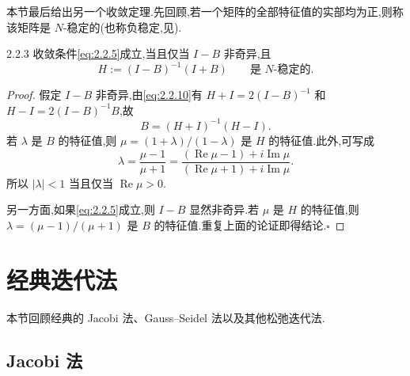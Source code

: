 本节最后给出另一个收敛定理.先回顾,若一个矩阵的全部特征值的实部均为正,则称该矩阵是 \(N\)-稳定的(也称负稳定,见).

\begin{theorem}[]{2.2.3}
收敛条件\eqref{eq:2.2.5}成立,当且仅当 \(I-B\) 非奇异,且
\begin{equation}\label{eq:2.2.10}
  H:=(I-B)^{-1}(I+B)\qquad \text{是 \(N\)-稳定的.}
\end{equation}
\end{theorem}

\begin{proof}
假定 \(I-B\) 非奇异,由\eqref{eq:2.2.10}有 \(H+I=2(I-B)^{-1}\) 和 \(H-I=2(I-B)^{-1}B\),故
\[
  B=(H+I)^{-1}(H-I).
\]
若 \(\lambda\) 是 \(B\) 的特征值,则 \(\mu=(1+\lambda)/(1-\lambda)\) 是 \(H\) 的特征值.此外,可写成
\[
  \lambda=\frac{\mu-1}{\mu+1}
    =\frac{(\operatorname{Re}\mu-1)+i\operatorname{Im}\mu}
           {(\operatorname{Re}\mu+1)+i\operatorname{Im}\mu}.
\]
所以 \(|\lambda|<1\) 当且仅当 \(\operatorname{Re}\mu>0\).

另一方面,如果\eqref{eq:2.2.5}成立,则 \(I-B\) 显然非奇异.若 \(\mu\) 是 \(H\) 的特征值,则 \(\lambda=(\mu-1)/(\mu+1)\) 是 \(B\) 的特征值.重复上面的论证即得结论.\hfill\(\square\)
\end{proof}

\section{经典迭代法}\label{sec:2.3}

本节回顾经典的 Jacobi 法、Gauss--Seidel 法以及其他松弛迭代法.

\subsection{Jacobi 法}\label{sec:2.3.1}

